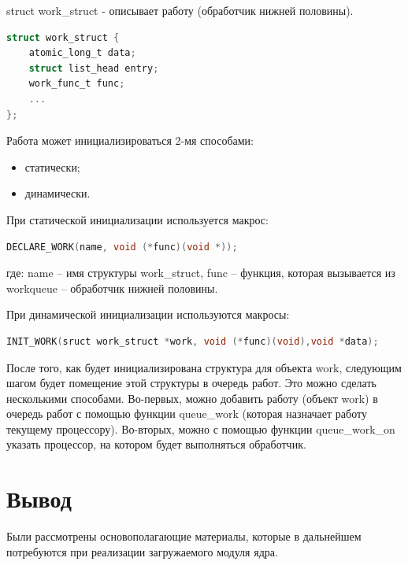 struct work\_struct - описывает работу (обработчик нижней половины).

\begin{lstlisting}[language=c, label=some-code, caption=Структура workqueue\_struct]
struct work_struct {
	atomic_long_t data;
	struct list_head entry;
	work_func_t func;
	...
};
\end{lstlisting}

Работа может инициализироваться 2-мя способами:

\begin{itemize}
	\item статически;
	\item динамически.
\end{itemize}

При статической инициализации используется макрос:

\begin{lstlisting}[language=c, label=some-code, caption=статическая инициализация]
	DECLARE_WORK(name, void (*func)(void *));
\end{lstlisting}

где: name – имя структуры work\_struct, func – функция, которая вызывается из workqueue – обработчик нижней половины.

При динамической инициализации используются макросы:

\begin{lstlisting}[language=c, label=some-code, caption=динамическая инициализация]
	INIT_WORK(sruct work_struct *work, void (*func)(void),void *data);
\end{lstlisting}

После того, как будет инициализирована структура для объекта work, следующим шагом будет помещение этой структуры в очередь работ. 
Это можно сделать несколькими способами. 
Во-первых, можно добавить работу (объект work) в очередь работ с помощью функции queue\_work (которая назначает работу текущему процессору). 
Во-вторых, можно с помощью функции queue\_work\_on указать процессор, на котором будет выполняться обработчик.

\section{Вывод}

Были рассмотрены основополагающие материалы, которые в дальнейшем потребуются при реализации 
загружаемого модуля ядра.



